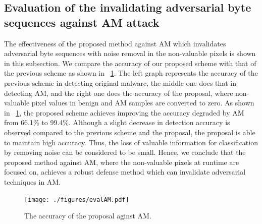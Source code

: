 \documentclass{ieeeaccess}
\begin{document}
\subsection{Evaluation of the invalidating adversarial byte sequences against AM attack}
The effectiveness of the proposed method against AM which invalidates adversarial byte sequences with noise removal in the non-valuable pixels is shown in this subsection.
We compare the accuracy of our proposed scheme with that of the previous scheme as shown in \figurename~\ref{fig:evalAM}.
The left graph represents the accuracy of the previous scheme in detecting original malware, the middle one does that in detecting AM, and the right one does the accuracy of the proposal, where non-valuable pixel values in benign and AM samples are converted to zero.
As shown in \figurename~\ref{fig:evalAM}, the proposed scheme achieves improving the accuracy degraded by AM from 66.1\% to 99.4\%.
Although a slight decrease in detection accuracy is observed compared to the previous scheme and the proposal, the proposal is able to maintain high accuracy.
Thus, the loss of valuable information for classification by removing noise can be considered to be small.
Hence, we conclude that the proposed method against AM, where the non-valuable pixels at runtime are focused on, achieves a robust defense method which can invalidate adversarial techniques in AM.

\begin{figure}[h]
 \centering
 \texttt{[image: ./figures/evalAM.pdf]}
 \caption{The accuracy of the proposal aginst AM.} 
 \label{fig:evalAM}
\end{figure}
\end{document}
